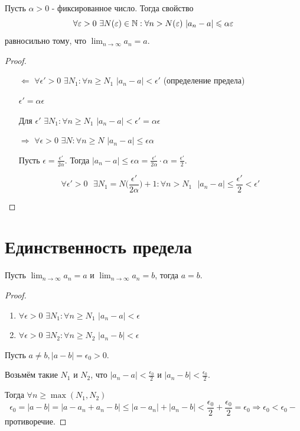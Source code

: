 	\begin{mention}
		Пусть $\alpha > 0$ - фиксированное число. Тогда свойство
		\[ \forall \varepsilon > 0 \text{ } \exists N(\varepsilon) \in \mathbb N : \forall n > N(\varepsilon) \text{ } |a_n - a| \leqslant \alpha \varepsilon \]
		равносильно тому, что $\lim_{n \to \infty} a_n = a.$
	\end{mention}
	
	\begin{proof}
		\begin{itemize}
			\item[$\Leftarrow$] $\forall \epsilon' > 0$ $\exists N_1 : \forall n \geqslant N_1$ $|a_n - a| < \epsilon'$ (определение предела)
			
			$\epsilon' = \alpha \epsilon$
			
			Для $\epsilon'$ $\exists N_1: \forall n \geqslant N_1$ $|a_n - a| < \epsilon' = \alpha \epsilon$
			\item[$\Rightarrow$] $\forall \epsilon > 0$ $\exists N: \forall n \geqslant N$ $|a_n - a| \leqslant \epsilon \alpha$
			
			Пусть $\epsilon = \frac{\epsilon'}{2 \alpha}$. Тогда $|a_n - a| \leqslant \epsilon \alpha = \frac{\epsilon'}{2 \alpha} \cdot \alpha = \frac{\epsilon'}{2}$.
			
			\[ \forall \epsilon' > 0 \text{ } \exists N_1 = N\bigg(\frac{\epsilon'}{2 \alpha}\bigg) + 1: \forall n > N_1 \text{ } |a_n - a| \leqslant \frac{\epsilon'}{2} < \epsilon' \]
		\end{itemize}
	\end{proof}
	
	\section{Единственность предела}
	
	\begin{sentence}
		Пусть $\lim_{n \to \infty} a_n = a$ и $\lim_{n \to \infty} a_n = b$, тогда $a = b$.
	\end{sentence}
	
	\begin{proof}
		\begin{enumerate}
			\item $\forall \epsilon > 0$ $\exists N_1: \forall n \geqslant N_1$ $|a_n - a| < \epsilon$
			\item $\forall \epsilon > 0$ $\exists N_2: \forall n \geqslant N_2$ $|a_n - b| < \epsilon$
		\end{enumerate}
		Пусть $a \neq b, |a - b| = \epsilon_0 > 0$.
		
		Возьмём такие $N_1$ и $N_2$, что $|a_n - a| < \frac{\epsilon_0}{2}$ и $|a_n - b| < \frac{\epsilon_0}{2}$.
		
		Тогда $\forall n \geqslant \max{(N_1, N_2)}$
		\[ \epsilon_0 = |a - b| = |a - a_n + a_n - b| \leqslant |a - a_n| + |a_n - b| < \frac{\epsilon_0}{2} + \frac{\epsilon_0}{2} = \epsilon_0 \Rightarrow \epsilon_0 < \epsilon_0 - \]
		противоречие.
	\end{proof}
	
